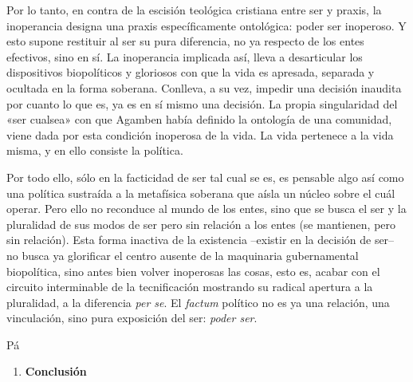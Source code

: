 Por lo tanto, en contra de la escisión teológica cristiana entre ser y praxis, la inoperancia designa una praxis específicamente ontológica: poder ser inoperoso. Y esto supone restituir al ser su pura diferencia, no ya respecto de los entes efectivos, sino en sí. La inoperancia implicada así, lleva a desarticular los dispositivos biopolíticos y gloriosos con que la vida es apresada, separada y ocultada en la forma soberana. Conlleva, a su vez, impedir una decisión inaudita por cuanto lo que es, ya es en sí mismo una decisión. La propia singularidad del «ser cualsea» con que Agamben había definido la ontología de una comunidad, viene dada por esta condición inoperosa de la vida. La vida pertenece a la vida misma, y en ello consiste la política.

Por todo ello, sólo en la facticidad de ser tal cual se es, es pensable algo así como una política sustraída a la metafísica soberana que aísla un núcleo sobre el cuál operar. Pero ello no reconduce al mundo de los entes, sino que se busca el ser y la pluralidad de sus modos de ser pero sin relación a los entes (se mantienen, pero sin relación). Esta forma inactiva de la existencia --existir en la decisión de ser-- no busca ya glorificar el centro ausente de la maquinaria gubernamental biopolítica, sino antes bien volver inoperosas las cosas, esto es, acabar con el circuito interminable de la tecnificación mostrando su radical apertura a la pluralidad, a la diferencia \emph{per se}. El \emph{factum }político no es ya una relación, una vinculación, sino pura exposición del ser: \emph{poder ser}.

Pá

\begin{enumerate}
\def\labelenumi{\arabic{enumi}.}
\setcounter{enumi}{4}
\item
  \textbf{Conclusión}
\end{enumerate}

